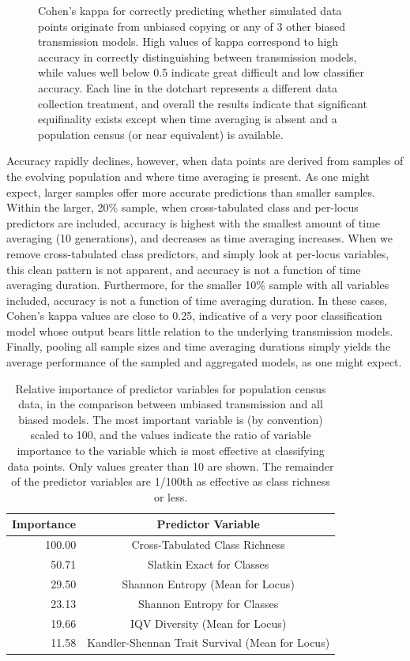 \documentclass[10pt,letterpaper]{article}
\begin{document}
\begin{figure}[h]
\caption{Cohen's kappa for correctly predicting whether simulated data points originate from unbiased copying or any of 3 other biased transmission models.  High values of kappa correspond to high accuracy in correctly distinguishing between transmission models, while values well below 0.5 indicate great difficult and low classifier accuracy.  Each line in the dotchart represents a different data collection treatment, and overall the results indicate that significant equifinality exists except when time averaging is absent and a population census (or near equivalent) is available.}
\label{fig4}
\end{figure}

Accuracy rapidly declines, however, when data points are derived from samples of the evolving population and where time averaging is present.  As one might expect, larger samples offer more accurate predictions than smaller samples.  Within the larger, 20\% sample, when cross-tabulated class and per-locus predictors are included, accuracy is highest with the smallest amount of time averaging (10 generations), and decreases as time averaging increases.  When we remove cross-tabulated class predictors, and simply look at per-locus variables, this clean pattern is not apparent, and accuracy is not a function of time averaging duration.  Furthermore, for the smaller 10\% sample with all variables included, accuracy is not a function of time averaging duration.  In these cases, Cohen's kappa values are close to 0.25, indicative of a very poor classification model whose output bears little relation to the underlying transmission models.  Finally, pooling all sample sizes and time averaging durations simply yields the average performance of the sampled and aggregated models, as one might expect.  

\begin{table}[ht]
\begin{tabular}{rc}
  \hline
Importance & Predictor Variable \\
  \hline
100.00 & Cross-Tabulated Class Richness \\
  50.71 & Slatkin Exact for Classes \\
  29.50 & Shannon Entropy (Mean for Locus) \\
  23.13 & Shannon Entropy for Classes \\
  19.66 & IQV Diversity (Mean for Locus) \\
  11.58 & Kandler-Shennan Trait Survival (Mean for Locus) \\
   \hline
\end{tabular}
\caption{Relative importance of predictor variables for population census data, in the comparison between unbiased transmission and all biased models.  The most important variable is (by convention) scaled to 100, and the values indicate the ratio of variable importance to the variable which is most effective at classifying data points.  Only values greater than 10 are shown. The remainder of the predictor variables are 1/100th as effective as class richness or less.}
\label{tab:varimp-popcensus}
\end{table}
\end{document}
